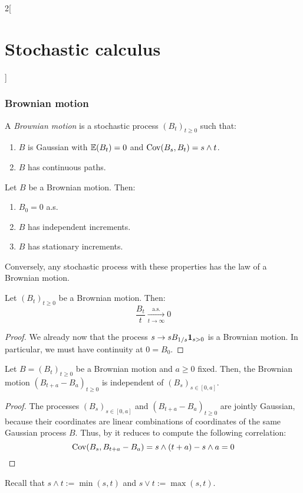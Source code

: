 \documentclass[../../../main_math.tex]{subfiles}
\begin{document}
\begin{multicols}{2}[\section{Stochastic calculus}]
  \subsubsection{Brownian motion}
  \begin{definition}
    A \emph{Brownian motion} is a stochastic process ${(B_t)}_{t\geq 0}$ such that:
    \begin{enumerate}
      \item $B$ is Gaussian with $\mathbb{E}(B_t)=0$ and $\mathrm{Cov}(B_s,B_t)=s\wedge t$.
      \item $B$ has continuous paths.
    \end{enumerate}
  \end{definition}
  \begin{proposition}
    Let $B$ be a Brownian motion. Then:
    \begin{enumerate}
      \item $B_0=0$ a.s.
      \item $B$ has independent increments.
      \item $B$ has stationary increments.
    \end{enumerate}
    Conversely, any stochastic process with these properties has the law of a Brownian motion.
  \end{proposition}
  \begin{theorem}
    Let ${(B_t)}_{t\geq 0}$ be a Brownian motion. Then:
    $$
      \frac{B_t}{t}\underset{t\to\infty}{\overset{\text{a.s.}}{\longrightarrow}}0
    $$
  \end{theorem}
  \begin{proof}
    We already now that the process $s\to sB_{1/s} \boldsymbol{\mathrm{1}}_{s>0}$ is a Brownian motion. In particular, we must have continuity at $0=B_0$.
  \end{proof}
  \begin{theorem}
    Let $B={(B_t)}_{t\geq 0}$ be a Brownian motion and $a\geq 0$ fixed. Then, the Brownian motion ${(B_{t+a}-B_a)}_{t\geq 0}$ is independent of ${(B_s)}_{s\in [0,a]}$.
  \end{theorem}
  \begin{proof}
    The processes ${(B_s)}_{s\in[0,a]}$ and ${(B_{t+a}-B_a)}_{t\geq 0}$ are jointly Gaussian, because their coordinates are linear combinations of coordinates of the same Gaussian process $B$. Thus, by  it reduces to compute the following correlation:
    $$
      \mathrm{Cov}(B_s,B_{t+a}-B_a)=s\wedge(t+a)-s\wedge a=0
    $$
  \end{proof}
  \begin{remark}
    Recall that $s\wedge t:=\min(s,t)$ and $s\vee t:=\max(s,t)$.
  \end{remark}

\end{multicols}
\end{document}
